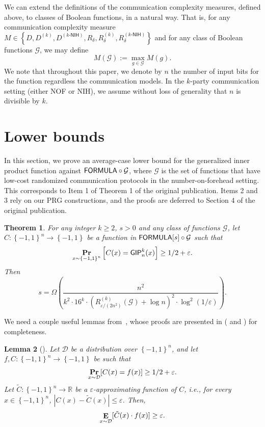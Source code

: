 \documentclass[10pt,a4paper]{article}
\newtheorem{theorem}{Theorem}
\newtheorem{lemma}[theorem]{Lemma}
\DeclareMathOperator*\Exp{{\bf E}}
\DeclareMathOperator*\Prob{{\bf Pr}}
\newcommand{\boolpm}{\left\{-1,1\right\}}
\newcommand{\FORMULA}{{\sf FORMULA}}
\newcommand{\GIP}{{\sf GIP}}
\newcommand{\real}{\mathbb{R}}
\newcommand{\cprn}[1]{\!\left(#1\right)}
\newcommand{\brkts}[1]{\left\{#1\right\}}
\begin{document}
    We can extend the definitions of the communication complexity measures, defined above, to classes of Boolean functions, in a natural way. That is, for any communication complexity measure $M\in\brkts{D,D^{(k)},D^{(k\text{-}\mathsf{NIH})},R_\delta,R_\delta^{(k)},R_\delta^{(k\text{-}\mathsf{NIH})}}$ and for any class of Boolean functions $\mathcal{G}$, we may define
    \[
        M\cprn{\mathcal{G}}:=\max_{g\in\mathcal{G}}M\cprn{g}.
    \]
	We note that throughout this paper, we denote by $n$ the number of input bits for the function regardless the communication models. In the $k$-party communication setting (either NOF or NIH), we assume without loss of generality that $n$ is divisible by $k$.
	

\setcounter{theorem}{18}
	\section{Lower bounds}\label{sec:lower-bounds}
	
	In this section, we prove an average-case lower bound for the generalized inner product function against $\FORMULA\circ\mathcal{G}$, where $\mathcal{G}$ is the set of functions that have low-cost randomized communication protocols in the number-on-forehead setting. This corresponds to Item 1 of Theorem 1 of the original publication. Items 2 and 3 rely on our PRG constructions, and the proofs are deferred to Section 4 of the original publication.
	

	\begin{theorem}\label{thm:lb-main}
		For any integer $k\geq 2$, $s>0$ and any class of functions $\mathcal{G}$, let $C\colon\boolpm^{n}\to\boolpm$ be a function in $\FORMULA[s]\circ\mathcal{G}$ such that
		\[
		    \Prob_{x\sim\boolpm^{n}}\left[C(x)=\GIP_{n}^{k}(x)\right]\geq 1/2+\varepsilon.
		\]
		Then
		\[
	  		s = \Omega\left( \frac{n^2}{k^2\cdot16^{k}\cdot\left(R^{(k)}_{\varepsilon/(2n^2)}(\mathcal{G})+\log n\right)^2\cdot\log^2(1/\varepsilon)}\right).
		\]
	\end{theorem}

	
	We need a couple useful lemmas from~\cite{Tal16}, whose proofs are presented in  ( and ) for completeness.
	
	\begin{lemma}[\cite{Tal16}]\label{lem:lb-Tal-1}
	    Let $\mathcal{D}$ be a distribution over $\boolpm^n$, and let $f,C\colon\boolpm^n\to\boolpm$ be such that
	    \[
	        \Prob_{x\sim\mathcal{D}}[C(x)=f(x)]\geq 1/2+\varepsilon.
	    \] 
	    Let $\tilde{C}\colon\boolpm^n\to\real$ be a $\varepsilon$-approximating function of $C$, i.e., for every $x\in\boolpm^n$, $|C(x)-\tilde{C}(x)|\leq \varepsilon$. Then,
	    \[
	        \Exp_{x\sim\mathcal{D}}[\tilde{C}(x)\cdot f(x)]\geq \varepsilon.
	    \]
	\end{lemma}
	
\end{document}
